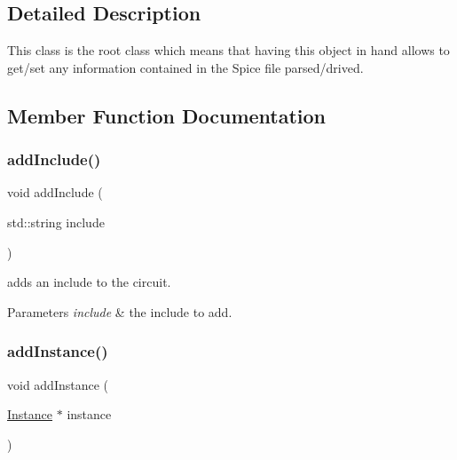 \subsection{Detailed Description}
This class is the root class which means that having this object in hand allows to get/set any information contained in the Spice file parsed/drived. 

\subsection{Member Function Documentation}
\mbox{\label{class_s_p_i_c_e_1_1_circuit_a30fc53c4da54215fdec3ab1b96ea1943}} 
\subsubsection{\texorpdfstring{add\+Include()}{addInclude()}}
{\footnotesize\ttfamily void add\+Include (\begin{DoxyParamCaption}\item[{std\+::string}]{include }\end{DoxyParamCaption})\hspace{0.3cm}{\ttfamily [inline]}}



adds an include to the circuit. 


\begin{DoxyParams}{Parameters}
{\em include} & the include to add. \\
\hline
\end{DoxyParams}
\mbox{\label{class_s_p_i_c_e_1_1_circuit_a7bb4a4532643568ab1ac2c229185a88e}} 
\subsubsection{\texorpdfstring{add\+Instance()}{addInstance()}}
{\footnotesize\ttfamily void add\+Instance (\begin{DoxyParamCaption}\item[{\hyperlink{class_s_p_i_c_e_1_1_instance}{Instance} $\ast$}]{instance }\end{DoxyParamCaption})\hspace{0.3cm}{\ttfamily [inline]}}



